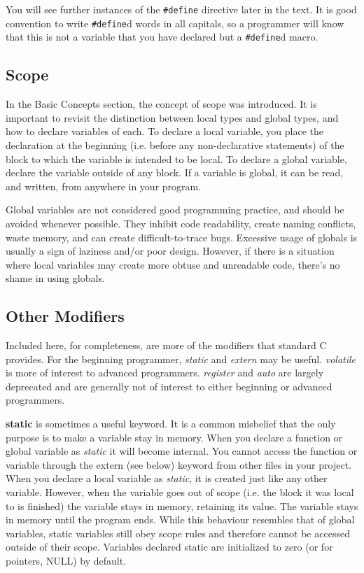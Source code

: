 You will see further instances of the \texttt{\#define} directive later in the
text. It is good convention to write \texttt{\#define}d words in all capitals,
so a programmer will know that this is not a variable that you have declared
but a \texttt{\#define}d macro.

\subsection{Scope}
In the Basic Concepts section, the concept of scope was introduced. It is
important to revisit the distinction between local types and global types, and
how to declare variables of each. To declare a local variable, you place the
declaration at the beginning (i.e. before any non-declarative statements) of
the block to which the variable is intended to be local. To declare a global
variable, declare the variable outside of any block. If a variable is global,
it can be read, and written, from anywhere in your program.

Global variables are not considered good programming practice, and should be
avoided whenever possible. They inhibit code readability, create naming
conflicts, waste memory, and can create difficult-to-trace bugs. Excessive
usage of globals is usually a sign of laziness and/or poor design. However, if
there is a situation where local variables may create more obtuse and
unreadable code, there's no shame in using globals.

\subsection{Other Modifiers}
Included here, for completeness, are more of the modifiers that standard C
provides. For the beginning programmer, \emph{static} and \emph{extern} may be
useful. \emph{volatile} is more of interest to advanced programmers.
\emph{register} and \emph{auto} are largely deprecated and are generally not of
interest to either beginning or advanced programmers.

\textbf{static} is sometimes a useful keyword.  It is a common misbelief that
the only purpose is to make a variable stay in memory. When you declare a
function or global variable as \emph{static} it will become internal. You
cannot access the function or variable through the extern (see below) keyword
from other files in your project. When you declare a local variable as
\emph{static}, it is created just like any other variable. However, when the
variable goes out of scope (i.e. the block it was local to is finished) the
variable stays in memory, retaining its value. The variable stays in memory
until the program ends. While this behaviour resembles that of global
variables, static variables still obey scope rules and therefore cannot be
accessed outside of their scope. Variables declared static are initialized to
zero (or for pointers, NULL) by default. 

